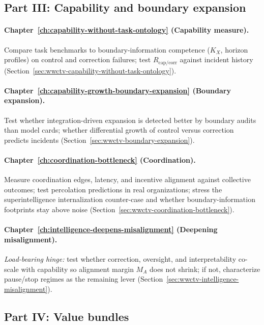 \subsection{Part III: Capability and boundary expansion}

\paragraph{Chapter~\ref{ch:capability-without-task-ontology} (Capability measure).}
Compare task benchmarks to boundary-information competence (\(K_X\), horizon profiles) on control and correction failures; test \(R_{\mathrm{cap/corr}}\) against incident history (Section~\ref{sec:wwctv-capability-without-task-ontology}).

\paragraph{Chapter~\ref{ch:capability-growth-boundary-expansion} (Boundary expansion).}
Test whether integration-driven expansion is detected better by boundary audits than model cards; whether differential growth of control versus correction predicts incidents (Section~\ref{sec:wwctv-boundary-expansion}).

\paragraph{Chapter~\ref{ch:coordination-bottleneck} (Coordination).}
Measure coordination edges, latency, and incentive alignment against collective outcomes; test percolation predictions in real organizations; stress the superintelligence internalization counter-case and whether boundary-information footprints stay above noise (Section~\ref{sec:wwctv-coordination-bottleneck}).

\paragraph{Chapter~\ref{ch:intelligence-deepens-misalignment} (Deepening misalignment).}
\emph{Load-bearing hinge:} test whether correction, oversight, and interpretability co-scale with capability so alignment margin \(M_A\) does not shrink; if not, characterize pause/stop regimes as the remaining lever (Section~\ref{sec:wwctv-intelligence-misalignment}).

\subsection{Part IV: Value bundles}

